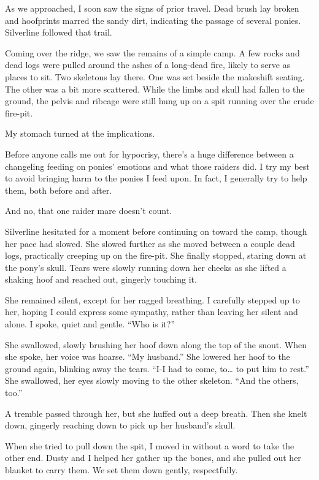 As we approached, I soon saw the signs of prior travel. Dead brush lay broken and hoofprints marred the sandy dirt, indicating the passage of several ponies. Silverline followed that trail.

Coming over the ridge, we saw the remains of a simple camp. A few rocks and dead logs were pulled around the ashes of a long-dead fire, likely to serve as places to sit. Two skeletons lay there. One was set beside the makeshift seating. The other was a bit more scattered. While the limbs and skull had fallen to the ground, the pelvis and ribcage were still hung up on a spit running over the crude fire-pit.

My stomach turned at the implications.

Before anyone calls me out for hypocrisy, there’s a huge difference between a changeling feeding on ponies’ emotions and what those raiders did. I try my best to avoid bringing harm to the ponies I feed upon. In fact, I generally try to help them, both before and after.

And no, that one raider mare doesn’t count.

Silverline hesitated for a moment before continuing on toward the camp, though her pace had slowed. She slowed further as she moved between a couple dead logs, practically creeping up on the fire-pit. She finally stopped, staring down at the pony’s skull. Tears were slowly running down her cheeks as she lifted a shaking hoof and reached out, gingerly touching it.

She remained silent, except for her ragged breathing. I carefully stepped up to her, hoping I could express some sympathy, rather than leaving her silent and alone. I spoke, quiet and gentle. “Who is it?”

She swallowed, slowly brushing her hoof down along the top of the snout. When she spoke, her voice was hoarse. “My husband.” She lowered her hoof to the ground again, blinking away the tears. “I-I had to come, to… to put him to rest.” She swallowed, her eyes slowly moving to the other skeleton. “And the others, too.”

A tremble passed through her, but she huffed out a deep breath. Then she knelt down, gingerly reaching down to pick up her husband’s skull.

When she tried to pull down the spit, I moved in without a word to take the other end. Dusty and I helped her gather up the bones, and she pulled out her blanket to carry them. We set them down gently, respectfully.


